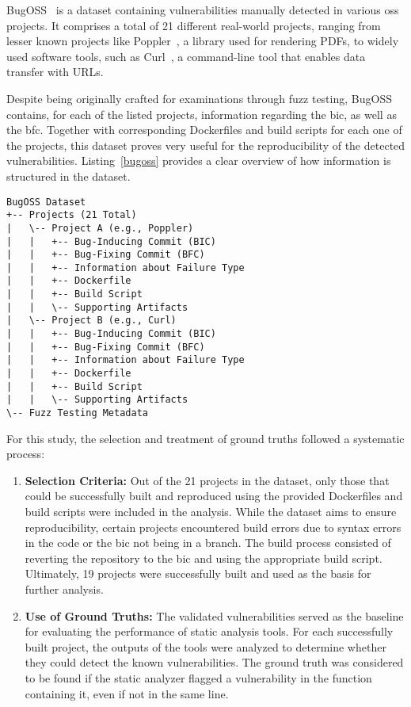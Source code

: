 BugOSS~\cite{BugOSS} is a dataset containing vulnerabilities manually detected in various \acl{oss} projects.
It comprises a total of 21 different real-world projects, ranging from lesser known projects like Poppler~\cite{poppler}, a library used for rendering PDFs, to widely used software tools, such as Curl~\cite{curl}, a command-line tool that enables data transfer with URLs.

Despite being originally crafted for examinations through fuzz testing, BugOSS contains, for each of the listed projects, information regarding the \ac{bic}, as well as the \ac{bfc}. 
Together with corresponding Dockerfiles and build scripts for each one of the projects, this dataset proves very useful for the reproducibility of the detected vulnerabilities.
Listing~\ref{bugoss} provides a clear overview of how information is structured in the dataset.

\begin{lstlisting}[caption={Hierarchy of the BugOSS dataset}, label={bugoss}]
BugOSS Dataset
+-- Projects (21 Total)
|   \-- Project A (e.g., Poppler)
|   |   +-- Bug-Inducing Commit (BIC)
|   |   +-- Bug-Fixing Commit (BFC)
|   |   +-- Information about Failure Type
|   |   +-- Dockerfile
|   |   +-- Build Script
|   |   \-- Supporting Artifacts
|   \-- Project B (e.g., Curl)
|   |   +-- Bug-Inducing Commit (BIC)
|   |   +-- Bug-Fixing Commit (BFC)
|   |   +-- Information about Failure Type
|   |   +-- Dockerfile
|   |   +-- Build Script
|   |   \-- Supporting Artifacts
\-- Fuzz Testing Metadata
\end{lstlisting}

For this study, the selection and treatment of ground truths followed a systematic process:
\begin{enumerate}
    \item \textbf{Selection Criteria:} Out of the 21 projects in the dataset, only those that could be successfully built and reproduced using the provided Dockerfiles and build scripts were included in the analysis. While the dataset aims to ensure reproducibility, certain projects encountered build errors due to syntax errors in the code or the \ac{bic} not being in a branch. The build process consisted of reverting the repository to the \ac{bic} and using the appropriate build script. Ultimately, 19 projects were successfully built and used as the basis for further analysis.

    \item \textbf{Use of Ground Truths:} The validated vulnerabilities served as the baseline for evaluating the performance of static analysis tools. For each successfully built project, the outputs of the tools were analyzed to determine whether they could detect the known vulnerabilities. The ground truth was considered to be found if the static analyzer flagged a vulnerability in the function containing it, even if not in the same line.
\end{enumerate}

